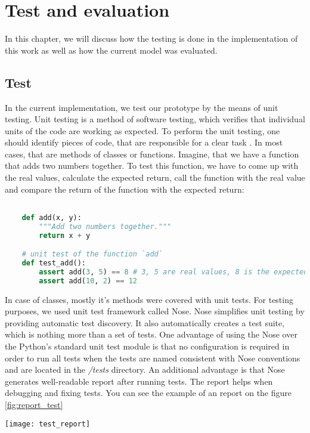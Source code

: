\chapter{Test and evaluation}
In this chapter, we will discuss how the testing is done
in the implementation of this work as well as how
the current model was evaluated.
\section{Test}
In the current implementation, we test our prototype by the means
of unit testing. Unit testing is a method of software testing,
which verifies that individual units of the code are working
as expected. To perform the unit testing, one should identify
pieces of code, that are responsible for a clear task \cite{Huizinga2007}.
In most cases,
that are methods of classes or functions. Imagine, that we have
a function that adds two numbers together. To test this function,
we have to come up with the real values, calculate the expected
return, call the function with the real value and compare
the return of the function with the expected return:

\begin{lstlisting}[language=Python, caption={TensorFlow example \cite{tensorflow2015-whitepaper}},label={list:test_ex}]

	def add(x, y):
		"""Add two numbers together."""
		return x + y

	# unit test of the function `add`
	def test_add():
		assert add(3, 5) == 8 # 3, 5 are real values, 8 is the expected return
		assert add(10, 2) == 12
\end{lstlisting}

In case of classes, mostly it's methods were covered with unit tests.
For testing purposes, we
used unit test framework called Nose. Nose simplifies unit testing
by providing automatic test discovery. It also automatically creates a test suite,
which is nothing more than a set of tests. One advantage of using the Nose
over the Python’s standard unit test module is that no configuration is required
in order to run all tests when the tests are named consistent with Nose conventions
and are located in the \emph{/tests} directory. An additional advantage is that
Nose generates well-readable report after running tests. The report helps
when debugging and fixing tests. You can see the example of an report on the figure
\ref{fig:report_test}

\begin{center}
	\texttt{[image: test\_report]}
	\caption{Output of executing command \lstinline{make test} in the root of the prototype
		with a failing test.
	}
	\label{fig:report_test}
\end{center}

